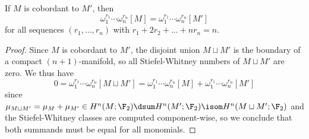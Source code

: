 \begin{corollary}
	If $M$ is cobordant to $M'$, then
	\begin{equation*}
		\omega_1^{r_1} \cdots \omega_n^{r_n}[M] = \omega_1^{r_1} \cdots \omega_n^{r_n}[M']
	\end{equation*}
	for all sequences $(r_1, \ldots, r_n)$ with $r_1 + 2 r_2 + \ldots + n r_n = n$.
\end{corollary}
\begin{proof}
	Since $M$ is cobordant to $M'$, the disjoint union $M \sqcup M'$ is the boundary of a compact $(n + 1)$-manifold, so all Stiefel-Whitney numbers of $M \sqcup M'$ are zero.
	We thus have
	\begin{equation*}
		0 = \omega_1^{r_1} \cdots \omega_n^{r_n}[M \sqcup M'] = \omega_1^{r_1} \cdots \omega_n^{r_n}[M] + \omega_1^{r_1} \cdots \omega_n^{r_n}[M']
	\end{equation*}
	since $\mu_{M \sqcup M'} = \mu_M + \mu_{M'} \in H^n(M; \F_2) \dsum H^n(M'; \F_2) \isom H^n(M \sqcup M'; \F_2)$ and the Stiefel-Whitney classes are computed component-wise, so we conclude that both summands must be equal for all monomials.
\end{proof}
